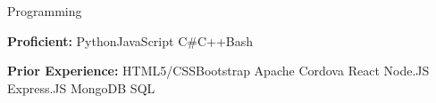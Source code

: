 \begin{cventries}
  \cventry
    {}
    {Programming}
    {}
    {}
    {
      \begin{cvitems}
        \item {\textbf{Proficient:}
        Python\enskip\cdotp\enskip JavaScript \enskip\cdotp\enskip C\#\enskip\cdotp\enskip C++\enskip\cdotp\enskip Bash}
        \item {\textbf{Prior Experience:}
        HTML5/CSS\enskip\cdotp\enskipBootStrap Bootstrap \enskip\cdotp\enskip Apache Cordova \enskip\cdotp\enskip React \enskip\cdotp\enskip Node.JS \enskip\cdotp\enskip Express.JS \enskip\cdotp\enskip MongoDB \enskip\cdotp\enskip SQL }
      \end{cvitems}
    }
\end{cventries}
